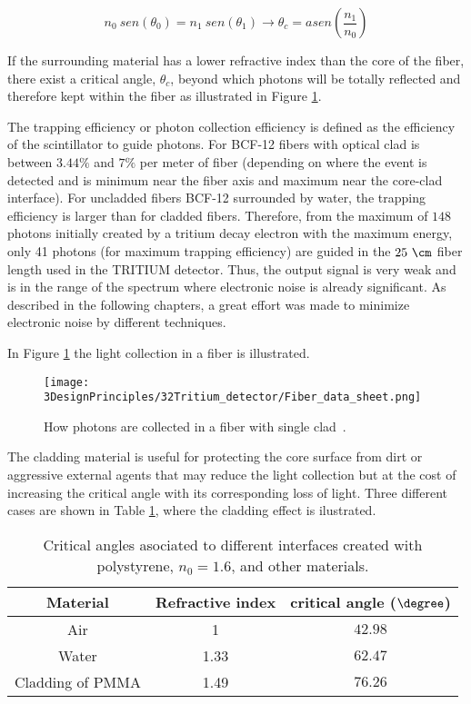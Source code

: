 \begin{equation}
n_0~sen(\theta_0) = n_1~sen(\theta_1) \longrightarrow \theta_c = asen\left(\frac{n_1}{n_0} \right)
\label{eq:Snell}
\end{equation}

If the surrounding material has a lower refractive index than the core of the fiber, there exist a critical angle, $\theta_c$, beyond which photons will be totally reflected and therefore kept within the fiber as illustrated in Figure \ref{fig:Fiber_physic}.

The trapping efficiency or photon collection efficiency is defined as the efficiency of the scintillator to guide photons. For BCF-12 fibers with optical clad is between $3.44\%$ and $7\%$ per meter of fiber (depending on where the event is detected and is minimum near the fiber axis  and maximum near the core-clad interface). For uncladded fibers BCF-12 surrounded by water, the trapping efficiency is larger than for cladded fibers. Therefore, from the maximum of $148$ photons initially created by a tritium decay electron with the maximum energy, only 41 photons (for maximum trapping efficiency) are guided in the $25~\cm$ fiber length used in the TRITIUM detector. Thus, the output signal is very weak and is in the range of the spectrum where electronic noise is already significant. As described in the following chapters, a great effort was made to minimize electronic noise by different techniques.

In Figure \ref{fig:Fiber_physic} the light collection in a fiber is illustrated.

\begin{figure}[htbp]
\centering
\texttt{[image: 3DesignPrinciples/32Tritium\_detector/Fiber\_data\_sheet.png]}
\caption{How photons are collected in a fiber with single clad\label{fig:Fiber_physic}~\cite{DataSheetBCF12Fiber}.}
\end{figure}

The cladding material is useful for protecting the core surface from dirt or aggressive external agents that may reduce the light collection but at the cost of increasing the critical angle with its corresponding loss of light. Three different cases are shown in Table \ref{tab:CriticalAngles}, where the cladding effect is ilustrated.

\begin{table}[htbp]
\begin{center}
\begin{tabular}{|c|c|c|}
\hline
Material & Refractive index & critical angle ($\degree$) \\
\hline \hline \hline
Air & 1 & $42.98$ \\ \hline
Water & 1.33 & $62.47$ \\ \hline
Cladding of PMMA & 1.49 & $76.26$ \\ \hline
\end{tabular}
\caption{Critical angles asociated to different interfaces created with polystyrene, $n_0=1.6$, and other materials.}
\label{tab:CriticalAngles}
\end{center}
\end{table}

